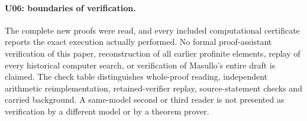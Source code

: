 \paragraph{U06: boundaries of verification.}
The complete new proofs were read, and every included computational
certificate reports the exact execution actually performed. No
formal proof-assistant verification of this paper, reconstruction
of all earlier profinite elements, replay of every historical
computer search, or verification of Masullo's entire draft is
claimed. The check table distinguishes whole-proof reading,
independent arithmetic reimplementation, retained-verifier replay,
source-statement checks and carried background. A same-model second
or third reader is not presented as verification by a different
model or by a theorem prover.

